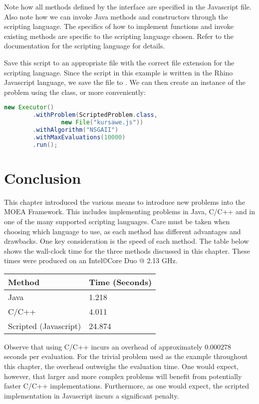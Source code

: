 Note how all methods defined by the  interface are specified in the Javascript file.  Also note how we can invoke Java methods and constructors through the scripting language.  The specifics of how to implement functions and invoke existing methods are specific to the scripting language chosen.  Refer to the documentation for the scripting language for details.

Save this script to an appropriate file with the correct file extension for the scripting language.  Since the script in this example is written in the Rhino Javascript language, we save the file to .  We can then create an instance of the problem using the  class, or more conveniently:

\begin{lstlisting}[language=Java]
new Executor()
		.withProblem(ScriptedProblem.class, 
				new File("kursawe.js"))
		.withAlgorithm("NSGAII")
		.withMaxEvaluations(10000)
		.run();
\end{lstlisting}

\section{Conclusion}
This chapter introduced the various means to introduce new problems into the MOEA Framework.  This includes implementing problems in Java, C/C++ and in one of the many supported scripting languages.  Care must be taken when choosing which language to use, as each method has different advantages and drawbacks.  One key consideration is the speed of each method.  The table below shows the wall-clock time for the three methods discussed in this chapter.  These times were produced on an Intel\copyright Core Duo @ 2.13 GHz.

\par
\begin{center}
\begin{tabular}{ll}
  Method & Time (Seconds) \\
  \hline
  Java & 1.218 \\
  C/C++ & 4.011 \\
  Scripted (Javascript) & 24.874
\end{tabular}
\end{center}

Observe that using C/C++ incurs an overhead of approximately $0.000278$ seconds per evaluation.  For the trivial problem used as the example throughout this chapter, the overhead outweighs the evaluation time.  One would expect, however, that larger and more complex problems will benefit from potentially faster C/C++ implementations.  Furthermore, as one would expect, the scripted implementation in Javascript incurs a significant penalty.

